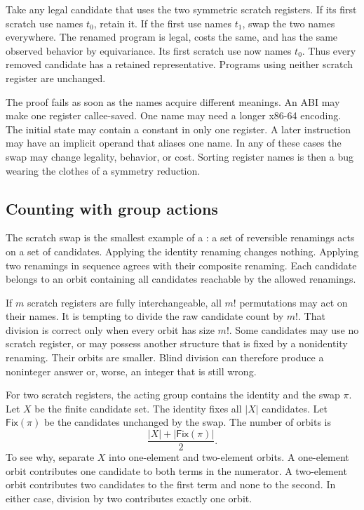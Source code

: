 \begin{proofkit}[title={Reader proof: first-use scratch naming is complete}]
Take any legal candidate that uses the two symmetric scratch registers. If its
first scratch use names \(t_0\), retain it. If the first use names \(t_1\), swap
the two names everywhere. The renamed program is legal, costs the same, and
has the same observed behavior by equivariance. Its first scratch use now
names \(t_0\). Thus every removed candidate has a retained representative.
Programs using neither scratch register are unchanged.
\end{proofkit}

The proof fails as soon as the names acquire different meanings. An ABI may
make one register callee-saved. One name may need a longer x86-64 encoding.
The initial state may contain a constant in only one register. A later
instruction may have an implicit operand that aliases one name. In any of
these cases the swap may change legality, behavior, or cost. Sorting register
names is then a bug wearing the clothes of a symmetry reduction.

\subsection{Counting with group actions}

The scratch swap is the smallest example of a : a set of
reversible renamings acts on a set of candidates. Applying the identity
renaming changes nothing. Applying two renamings in sequence agrees with their
composite renaming. Each candidate belongs to an orbit containing all
candidates reachable by the allowed renamings.

If \(m\) scratch registers are fully interchangeable, all \(m!\) permutations
may act on their names. It is tempting to divide the raw candidate count by
\(m!\). That division is correct only when every orbit has size \(m!\). Some
candidates may use no scratch register, or may possess another structure that
is fixed by a nonidentity renaming. Their orbits are smaller. Blind division
can therefore produce a noninteger answer or, worse, an integer that is still
wrong.

For two scratch registers, the acting group contains the identity and the swap
\(\pi\). Let \(X\) be the finite candidate set. The identity fixes all
\(|X|\) candidates. Let
\(\mathsf{Fix}(\pi)\) be the candidates unchanged by the swap. The number
of orbits is
\[
  \frac{|X|+|\mathsf{Fix}(\pi)|}{2}.
\]
To see why, separate \(X\) into one-element and two-element orbits. A
one-element orbit contributes one candidate to both terms in the numerator.
A two-element orbit contributes two candidates to the first term and none to
the second. In either case, division by two contributes exactly one orbit.

